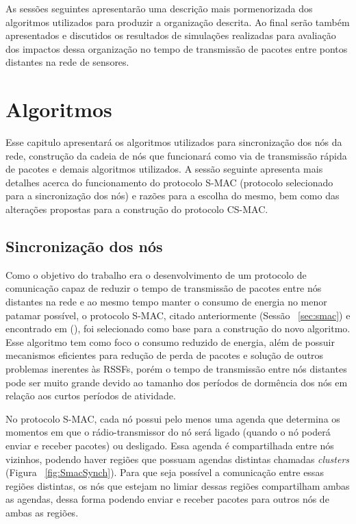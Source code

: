 As sessões seguintes apresentarão uma descrição mais pormenorizada dos algoritmos utilizados para produzir a organização descrita. Ao final serão também apresentados e discutidos os resultados de simulações realizadas para avaliação dos impactos dessa organização no tempo de transmissão de pacotes entre pontos distantes na rede de sensores.

\section{Algoritmos}

Esse capitulo apresentará os algoritmos utilizados para sincronização dos nós da rede, construção da  cadeia de nós que funcionará como via de transmissão rápida de pacotes e demais algoritmos utilizados. A sessão seguinte apresenta mais detalhes acerca do funcionamento do protocolo S-MAC (protocolo selecionado para a sincronização dos nós) e razões para a escolha do mesmo, bem como das alterações propostas para a construção do protocolo CS-MAC.

\subsection{Sincronização dos nós}

Como o objetivo do trabalho era o desenvolvimento de um protocolo de comunicação capaz de reduzir o tempo de transmissão de pacotes entre nós distantes na rede e ao mesmo tempo manter o consumo de energia no menor patamar possível, o protocolo S-MAC, citado anteriormente (Sessão ~\ref{sec:smac}) e encontrado em  (\citeyear{ye04}), foi selecionado como base para a construção do novo algoritmo. Esse algoritmo tem como foco o consumo reduzido de energia, além de possuir mecanismos eficientes para redução de perda de pacotes e solução de outros problemas inerentes às RSSFs, porém o tempo de transmissão entre nós distantes pode ser muito grande devido ao tamanho dos períodos de dormência dos nós em relação aos curtos períodos de atividade.

No protocolo S-MAC, cada nó possui pelo menos uma agenda que determina os momentos em que o rádio-transmissor do nó será ligado (quando o nó poderá enviar e receber pacotes) ou desligado. Essa agenda é compartilhada entre nós vizinhos, podendo haver regiões que possuam agendas distintas chamadas \emph{clusters} (Figura ~\ref{fig:SmacSynch}). Para que seja possível a comunicação entre essas regiões distintas, os nós que estejam no limiar dessas regiões compartilham ambas as agendas, dessa forma podendo enviar e receber pacotes para outros nós de ambas as regiões.


